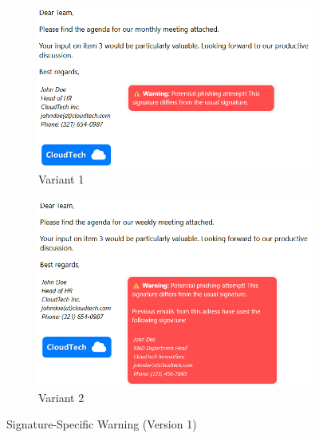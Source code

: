 \documentclass[
  a4paper,  %
  twoside,  %
  bibliography=totoc,
  headsepline,
  cleardoublepage=empty,
  parskip=half,
  draft=false
]{scrbook}
\begin{document}
\begin{figure} [H]
\centering
\begin{subfigure}{.5\textwidth}
  \centering
  \includegraphics[width=1\linewidth]{figures/sig1_old.png}
  \caption{Variant 1}
\end{subfigure}%
\begin{subfigure}{.5\textwidth}
  \centering
  \includegraphics[width=1\linewidth]{figures/sig2_old.png}
  \caption{Variant 2}
\end{subfigure}
\caption{Signature-Specific Warning (Version 1)}
\end{figure}
\end{document}

